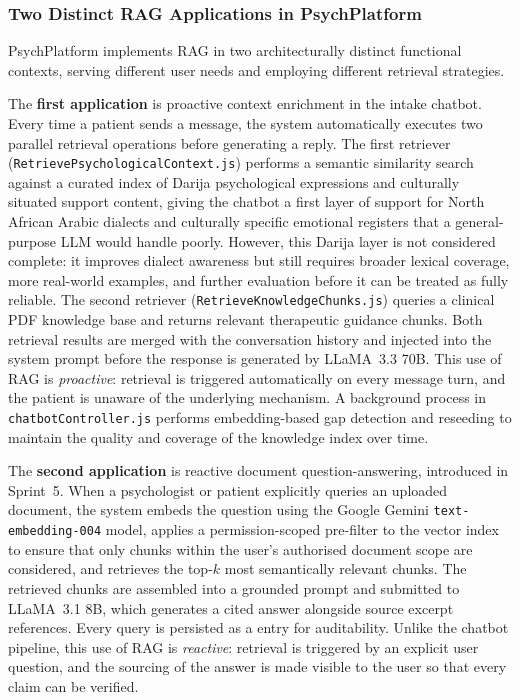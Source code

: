 \documentclass[a4paper,12pt]{report}
\begin{document}
\subsubsection{Two Distinct RAG Applications in PsychPlatform}

PsychPlatform implements RAG in two architecturally distinct functional contexts, serving different user needs and employing different retrieval strategies.

The \textbf{first application} is proactive context enrichment in the intake chatbot. Every time a patient sends a message, the system automatically executes two parallel retrieval operations before generating a reply. The first retriever (\texttt{RetrievePsychologicalContext.js}) performs a semantic similarity search against a curated index of Darija psychological expressions and culturally situated support content, giving the chatbot a first layer of support for North African Arabic dialects and culturally specific emotional registers that a general-purpose LLM would handle poorly. However, this Darija layer is not considered complete: it improves dialect awareness but still requires broader lexical coverage, more real-world examples, and further evaluation before it can be treated as fully reliable. The second retriever (\texttt{RetrieveKnowledgeChunks.js}) queries a clinical PDF knowledge base and returns relevant therapeutic guidance chunks. Both retrieval results are merged with the conversation history and injected into the system prompt before the response is generated by LLaMA~3.3 70B. This use of RAG is \emph{proactive}: retrieval is triggered automatically on every message turn, and the patient is unaware of the underlying mechanism. A background process in \texttt{chatbotController.js} performs embedding-based gap detection and reseeding to maintain the quality and coverage of the knowledge index over time.

The \textbf{second application} is reactive document question-answering, introduced in Sprint~5. When a psychologist or patient explicitly queries an uploaded document, the system embeds the question using the Google Gemini \texttt{text-embedding-004} model, applies a permission-scoped pre-filter to the vector index to ensure that only chunks within the user's authorised document scope are considered, and retrieves the top-$k$ most semantically relevant chunks. The retrieved chunks are assembled into a grounded prompt and submitted to LLaMA~3.1 8B, which generates a cited answer alongside source excerpt references. Every query is persisted as a  entry for auditability. Unlike the chatbot pipeline, this use of RAG is \emph{reactive}: retrieval is triggered by an explicit user question, and the sourcing of the answer is made visible to the user so that every claim can be verified.
\end{document}
